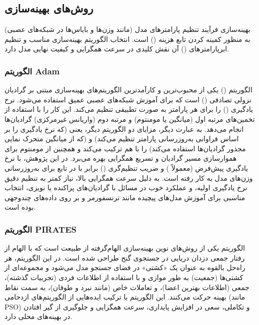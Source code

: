 \subsection{روش‌های بهینه‌سازی}
بهینه‌سازی فرآیند تنظیم پارامترهای مدل (مانند وزن‌ها و بایاس‌ها در شبکه‌های عصبی) به منظور کمینه کردن تابع هزینه () است. انتخاب الگوریتم بهینه‌سازی مناسب و تنظیم ابرپارامترهای () آن نقش کلیدی در سرعت همگرایی و کیفیت نهایی مدل دارد.

\subsubsection{الگوریتم Adam}
الگوریتم  () \cite{Kingma2015} یکی از محبوب‌ترین و کارآمدترین الگوریتم‌های بهینه‌سازی مبتنی بر گرادیان نزولی تصادفی () است که برای آموزش شبکه‌های عصبی عمیق استفاده می‌شود.  نرخ یادگیری () را برای هر پارامتر به صورت تطبیقی تنظیم می‌کند. این کار را با استفاده از تخمین‌های مرتبه اول (میانگین یا مومنتوم) و مرتبه دوم (واریانس غیرمرکزی) گرادیان‌ها انجام می‌دهد. به عبارت دیگر،  مزایای دو الگوریتم دیگر، یعنی  (که نرخ یادگیری را بر اساس فراوانی به‌روزرسانی پارامتر تنظیم می‌کند) و  (که از میانگین متحرک نمایی مجذور گرادیان‌ها استفاده می‌کند) را با هم ترکیب می‌کند و همچنین از مومنتوم برای هموارسازی مسیر گرادیان و تسریع همگرایی بهره می‌برد.
در این پژوهش،  با نرخ یادگیری پیش‌فرض (معمولاً ) و ضریب تنظیم‌گری  () برابر با  در تابع  برای به‌روزرسانی وزن‌های مدل  به کار رفته است.  به دلیل سرعت همگرایی بالا، نیاز کمتر به تنظیم دقیق نرخ یادگیری اولیه، و عملکرد خوب در مسائل با گرادیان‌های پراکنده یا نویزی، انتخاب مناسبی برای آموزش مدل‌های پیچیده مانند ترنسفورمر و  بر روی داده‌های چندوجهی بوده است.

\subsubsection{الگوریتم PIRATES}
الگوریتم  یکی از روش‌های نوین بهینه‌سازی الهام‌گرفته از طبیعت است که با الهام از رفتار جمعی دزدان دریایی در جستجوی گنج طراحی شده است. در این الگوریتم، هر راه‌حل بالقوه به عنوان یک «کشتی» در فضای جستجو مدل می‌شود و مجموعه‌ای از کشتی‌ها (جمعیت) به طور موازی و با استفاده از اطلاعات فردی (تجربیات گذشته)، جمعی (اطلاعات بهترین اعضا)، و تعاملات خاص (مانند نبرد و طوفان)، به سمت نقاط بهینه حرکت می‌کنند. این الگوریتم با ترکیب ایده‌هایی از الگوریتم‌های ازدحامی (مانند PSO) و تکاملی، سعی در افزایش پایداری، سرعت همگرایی و جلوگیری از گیر افتادن در بهینه‌های محلی دارد.

